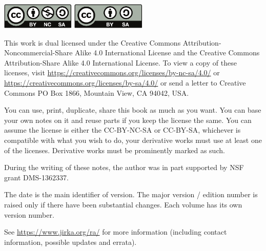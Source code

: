 \documentclass[12pt]{book}
\theoremstyle{plain}
\theoremstyle{remark}
\theoremstyle{definition}
\theoremstyle{exercise}
\theoremstyle{example}
\begin{document}
%



\bigskip

\noindent
\includegraphics[width=1.38in]{figures/license}
\quad
\includegraphics[width=1.38in]{figures/license2}

\bigskip

\noindent
This work
is dual licensed under
the Creative Commons
Attribution-Non\-commercial-Share Alike 4.0 International License and
the Creative Commons
Attribution-Share Alike 4.0 International License.
To view a
copy of these licenses, visit
\url{https://creativecommons.org/licenses/by-nc-sa/4.0/}
or
\url{https://creativecommons.org/licenses/by-sa/4.0/}
or send a letter to
Creative Commons
PO Box 1866, Mountain View, CA 94042, USA\@.

\bigskip

\noindent
You can use, print, duplicate, share this book as much as you want.  You can
base your own notes on it and reuse parts if you keep the license the
same.  You can assume the license is either the CC-BY-NC-SA or CC-BY-SA\@,
whichever is compatible with what you wish to do, your derivative works must
use at least one of the licenses.
Derivative works must be prominently marked as such.

\bigskip

\noindent
During the writing of these notes, 
the author was in part supported by NSF grant DMS-1362337.

\bigskip

\noindent
The date is the main identifier of version.  The major version / edition
number is raised only if there have been substantial changes.  Each
volume has its own version number.

\bigskip

\noindent
See \url{https://www.jirka.org/ra/} for more information
(including contact information, possible updates and errata).
\end{document}
